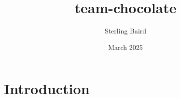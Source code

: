 \documentclass{article}
\title{team-chocolate}
\author{Sterling Baird}
\date{March 2025}
\begin{document}
\maketitle

\section{Introduction}
\end{document}
